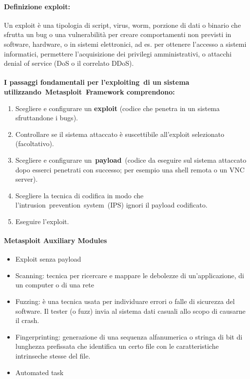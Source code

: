 \documentclass{article}
\begin{document}
\paragraph{Definizione exploit:}
Un exploit è una tipologia di script, virus, worm, porzione di dati o binario che sfrutta un bug 
o una vulnerabilità per creare comportamenti non previsti in software, hardware, o in sistemi elettronici, 
ad es. per ottenere l'accesso a sistemi informatici, permettere l'acquisizione dei privilegi amministrativi, 
o attacchi denial of service (DoS o il correlato DDoS). \\\\
\textbf{I passaggi fondamentali per l'exploiting di un sistema utilizzando Metasploit Framework comprendono:}
\begin{enumerate}
    \item Scegliere e configurare un \textbf{exploit} (codice che penetra in un sistema sfruttandone i bugs). 
    \item Controllare se il sistema attaccato è suscettibile all’exploit selezionato (facoltativo).
    \item Scegliere e configurare un \textbf{payload} (codice da eseguire sul sistema attaccato dopo esserci 
    penetrati con successo; per esempio una shell remota o un VNC server).
    \item Scegliere la tecnica di codifica in modo che l’intrusion prevention system (IPS) ignori il payload 
    codificato. 
    \item Eseguire l’exploit.
\end{enumerate}
\paragraph{Metasploit Auxiliary Modules}
\begin{itemize}
    \item Exploit senza payload
    \item Scanning: tecnica per ricercare e mappare le debolezze di un'applicazione, di un computer o 
    di una rete
    \item Fuzzing: è una tecnica usata per individuare errori o falle di sicurezza del software. Il tester
     (o fuzz) invia al sistema dati casuali allo scopo di causarne il crash.
     \item Fingerprinting: generazione di una sequenza alfanumerica o stringa di bit di lunghezza prefissata 
     che identifica un certo file con le caratteristiche intrinseche stesse del file.
     \item Automated task
\end{itemize}
\end{document}
